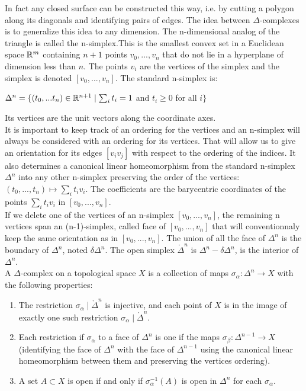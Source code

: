 \documentclass[12pt, a4paper]{article}
\begin{document}
In fact any closed surface can be constructed this way, i.e. by cutting a polygon along its diagonals and identifying pairs of edges. The idea between $\Delta$-complexes is to generalize this idea to any dimension. The n-dimensional analog of the triangle is called the n-simplex.This is the smallest convex set in a Euclidean space $\mathbb{R}^m$ containing $n + 1$ points $v_0 , ... , v_n$ that do not lie in a hyperplane of dimension less than $n$. The points $v_i$ are the vertices of the simplex and the simplex is denoted $[v_0, ..., v_n]$. The standard n-simplex is:\\

\begin{center}
  $\Delta^n = \{ (t_0,...t_n) \in \mathbb{R}^{n+1} \mid \sum_i t_i  = 1$ and $t_i \ge 0$ for all $i \}$
\end{center}

Its vertices are the unit vectors along the coordinate axes.\\

It is important to keep track of an ordering for the vertices and an n-simplex will always be considered with an ordering for its vertices. That will allow us to give an orientation for its edges $[v_iv_j]$ with respect to the ordering of the indices. It also determines a canonical linear homeomorphism from the standard n-simplex $\Delta^n$ into any other n-simplex preserving the order of the vertices: $(t_0, ..., t_n) \mapsto \sum_i t_i v_i$. The coefficients are the barycentric coordinates of the points $\sum_i t_i v_i$ in $[v_0, ..., v_n]$.\\

If we delete one of the vertices of an n-simplex $[v_0, ..., v_n]$, the remaining n vertices span an (n-1)-simplex, called face of $[v_0, ..., v_n]$ that will conventionnaly keep the same orientation as in $[v_0, ..., v_n]$. The union of all the face of $\Delta^n$ is the boundary of $\Delta^n$, noted $\delta \Delta^n$. The open simplex $\mathring{\Delta}^n$ is $\Delta^n - \delta \Delta^n$, is the interior of $\Delta^n$.\\

A $\Delta$-complex on a topological space $X$ is a collection of maps $\sigma_\alpha : \Delta^n \to X$  with the following properties:\\

\begin{enumerate}[label=(\roman*)]
  \item The restriction $\sigma_\alpha \mid \mathring{\Delta}^n$ is injective, and each point of $X$ is in the image of exactly one such restriction $\sigma_\alpha \mid \mathring{\Delta}^n$.
  \item Each restriction if $\sigma_\alpha$ to a face of $\Delta^n$ is one if the maps $\sigma_\beta : \Delta^{n-1} \to X$ (identifying the face of $\Delta^n$ with the face of $\Delta^{n-1}$ using the canonical linear homeomorphism between them and preserving the vertices ordering).
  \item A set $A \subset X$ is open if and only if $\sigma_\alpha^{-1}(A)$ is open in $\Delta^n$ for each $\sigma_\alpha$.
\end{enumerate}
\end{document}
